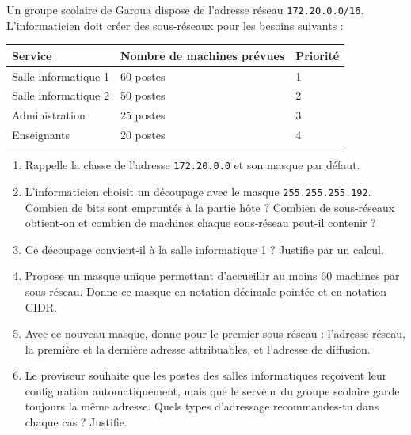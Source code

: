 \documentclass[11pt]{article}
\begin{document}
\begin{exercice}
Un groupe scolaire de Garoua dispose de l'adresse réseau \texttt{172.20.0.0/16}. L'informaticien doit créer des sous-réseaux pour les besoins suivants :
\begin{center}
\begin{tabularx}{\linewidth}{|l|X|l|}
\hline
\rowcolor{popblueL} \textbf{Service} & \textbf{Nombre de machines prévues} & \textbf{Priorité} \\
\hline
Salle informatique 1 & 60 postes & 1 \\
\hline
Salle informatique 2 & 50 postes & 2 \\
\hline
Administration & 25 postes & 3 \\
\hline
Enseignants & 20 postes & 4 \\
\hline
\end{tabularx}
\end{center}
\begin{enumerate}
\item Rappelle la classe de l'adresse \texttt{172.20.0.0} et son masque par défaut.
\item L'informaticien choisit un découpage avec le masque \texttt{255.255.255.192}. Combien de bits sont empruntés à la partie hôte ? Combien de sous-réseaux obtient-on et combien de machines chaque sous-réseau peut-il contenir ?
\item Ce découpage convient-il à la salle informatique 1 ? Justifie par un calcul.
\item Propose un masque unique permettant d'accueillir au moins 60 machines par sous-réseau. Donne ce masque en notation décimale pointée et en notation CIDR.
\item Avec ce nouveau masque, donne pour le premier sous-réseau : l'adresse réseau, la première et la dernière adresse attribuables, et l'adresse de diffusion.
\item Le proviseur souhaite que les postes des salles informatiques reçoivent leur configuration automatiquement, mais que le serveur du groupe scolaire garde toujours la même adresse. Quels types d'adressage recommandes-tu dans chaque cas ? Justifie.
\end{enumerate}
\end{exercice}
\end{document}
